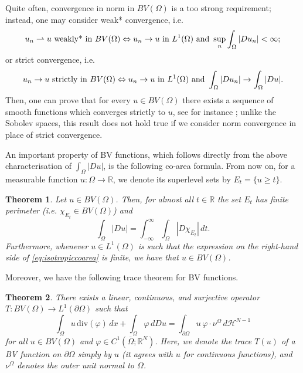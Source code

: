 \documentclass[reqno,12pt]{amsart}
\newtheorem{theorem}{Theorem}[section]
\def\R{\mathbb R}
\numberwithin{equation}{section}
\begin{document}
Quite often, convergence in norm in $BV(\Omega)$ is a too strong requirement; instead, one may consider weak* convergence, i.e.
\begin{equation}
u_n \rightharpoonup u \hbox{ weakly* in } BV(\Omega)  \Leftrightarrow   u_n \rightarrow u \hbox{ in } L^1(\Omega) \hbox{ and } \sup_n \int_\Omega |Du_n| < \infty;
\end{equation}
or strict convergence, i.e.
\begin{equation}
u_n \rightarrow u \hbox{ strictly in } BV(\Omega) \Leftrightarrow   u_n \rightarrow u \hbox{ in } L^1(\Omega) \hbox{ and } \int_\Omega |Du_n| \rightarrow \int_\Omega |Du|.
\end{equation}
Then, one can prove that for every $u \in BV(\Omega)$ there exists a sequence of smooth functions which converges strictly to $u$, see for instance \cite{AFP}; unlike the Sobolev spaces, this result does not hold true if we consider norm convergence in place of strict convergence.

An important property of BV functions, which follows directly from the above characterisation of $\int_\Omega |Du|$, is the following co-area formula. From now on, for a measurable function $u: \Omega \rightarrow \R$, we denote its superlevel sets by $E_t = \{ u \geq t \}$.

\begin{theorem}
Let $u \in BV(\Omega)$. Then, for almost all $t \in \R$ the set $E_t$ has finite perimeter (i.e. $\chi_{E_t} \in BV(\Omega)$) and
\begin{equation}\label{eq:isotropiccoarea}
\int_\Omega |Du| = \int_{-\infty}^\infty \int_\Omega |D\chi_{E_t}| \, dt.
\end{equation}
Furthermore, whenever $u \in L^1(\Omega)$ is such that the expression on the right-hand side of \eqref{eq:isotropiccoarea} is finite, we have that $u \in BV(\Omega)$.
\end{theorem}

Moreover, we have the following trace theorem for BV functions.

\begin{theorem}\label{thm:standardtracetheorem}
There exists a linear, continuous, and surjective operator $T: BV(\Omega) \rightarrow L^1(\partial\Omega)$ such that
\begin{equation}
\int_\Omega u \, \mathrm{div} (\varphi) \, dx + \int_\Omega \varphi \, dDu = \int_{\partial\Omega} u \, \varphi \cdot \nu^\Omega \, d\mathcal{H}^{N-1}
\end{equation}
for all $u \in BV(\Omega)$ and $\varphi \in C^1(\overline{\Omega}; \mathbb{R}^N)$. Here, we denote the trace $T(u)$ of a BV function on $\partial\Omega$ simply by $u$ (it agrees with $u$ for continuous functions), and $\nu^\Omega$ denotes the outer unit normal to $\Omega$.
\end{theorem}
\end{document}

